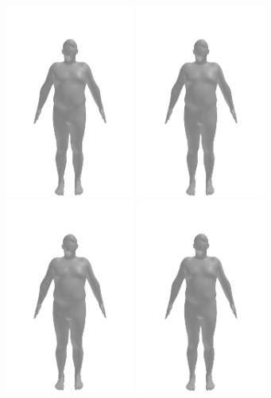 \begin{figure}[h]
    \centering
    \includegraphics[width=120pt]{files/patient_2/2_6}
    \includegraphics[width=120pt]{files/patient_2/2_7}
    \includegraphics[width=120pt]{files/patient_2/2_8}
    \includegraphics[width=120pt]{files/patient_2/2_9}

\end{figure}
